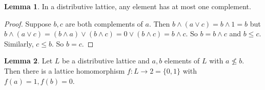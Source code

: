 \documentclass[a4paper]{article}
\theoremstyle{definition}
\newtheorem*{lemma}{Lemma}
\begin{document}
\begin{lemma}
  In a distributive lattice, any element has at most one complement.
\end{lemma}

\begin{proof}
  Suppose $b, c$ are both complements of $a$. Then $b\wedge (a\vee c) = b\wedge 1 = b$ but $b\wedge(a\vee c) = (b\wedge a)\vee (b\wedge c) = 0\vee (b\wedge c) = b\wedge c.$ So $b = b\wedge c$ and $b \leq c$. Similarly, $c\leq b$. So $b = c$.
\end{proof}

\begin{lemma}
  Let $L$ be a distributive lattice and $a, b$ elements of $L$ with $a\not\leq b$. Then there is a lattice homomorphism $f: L\to 2 = \{0, 1\}$ with $f(a) = 1, f(b) = 0$.
\end{lemma}
\end{document}
